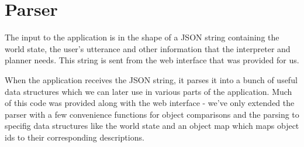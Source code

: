 \section*{Parser}
The input to the application is in the shape of a JSON string containing the world state, the user's utterance and other information that the interpreter and planner needs.
This string is sent from the web interface that was provided for us.

When the application receives the JSON string, it parses it into a bunch of useful data structures which we can later use in various parts of the application.
Much of this code was provided along with the web interface - we've only extended the parser with a few convenience functions for object comparisons and the parsing to specifig data structures like the world state and an object map which maps object ids to their corresponding descriptions.
